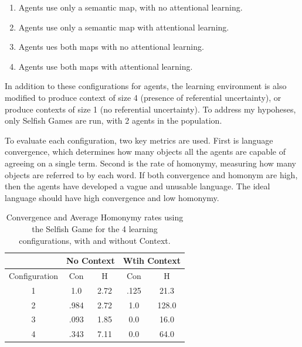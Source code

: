 \documentclass[a4paper,11pt]{article}
\begin{document}
{\small
\begin{enumerate}

\item Agents use only a semantic map, with no attentional learning.

\item Agents use only a semantic map with attentional learning.

\item Agents ues both maps with no attentional learning.

\item Agents use both maps with attentional learning.

\end{enumerate}
}

In addition to these configurations for agents, the learning environment is also
modified to produce context of size 4 (presence of referential uncertainty), or
produce contexts of size 1 (no referential uncertainty).  To address my
hypoheses, only Selfish Games are run, with 2 agents in the population.

To evaluate each configuration, two key metrics are used.  First is language
convergence, which determines how many objects all the agents are capable of
agreeing on a
single term.  Second is the rate of homonymy, measuring how many objects are
referred to by each word.  If both convergence and homonym are high, then the
agents have developed a vague and unusable language.  The ideal language should
have high convergence and low homonymy.  

\begin{center}
\begin{table}
\begin{tabular}[ht]{ | c | c | c | c | c |}
\hline
 & \multicolumn{2}{|c|}{No Context} & \multicolumn{2}{|c|}{Wtih Context} \\
 \hline
 Configuration & Con & H& Con & H \\
 \hline
 1 & 1.0 & 2.72 & .125 & 21.3 \\
 2 & .984 & 2.72 & 1.0 & 128.0 \\
 3 & .093 & 1.85 & 0.0 & 16.0 \\
 4 & .343 & 7.11 & 0.0 & 64.0 \\
 \hline
\end{tabular}
\caption{Convergence and Average Homonymy rates using the Selfish Game  for the 4 learning
configurations, with and without Context.}  
\label{tb:game-result}
\end{table}
\end{center}
\end{document}
